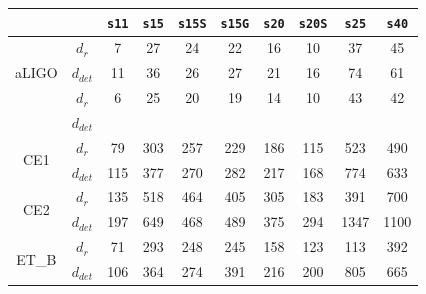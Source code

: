 \begin{table}
  \centering
  \begin{tabular}{c|c|cccccccc}







    
    
\multicolumn{2}{c|}{}  & \texttt{s11} & \texttt{s15} & \texttt{s15S} & \texttt{s15G} & \texttt{s20} & \texttt{s20S} & \texttt{s25}  & \texttt{s40}\\   

\hline
\multirow{3}{*}{aLIGO} & $d_{r}$ & 7   & 27  & 24  & 22  & 16  & 10  & 37  & 45 \\
\cline{2-10}
                       & $d_{det}$ & 11 & 36 & 26 & 27 & 21 & 16 & 74 & 61\\

\hline
\hline
\multirow{3}{*}{ADV}   & $d_{r}$ & 6   & 25  & 20  & 19  & 14  & 10  & 43  & 42 \\
\cline{2-10}
                       & $d_{det}$ &  &  &  &  &  &  &  & \\

\hline
\hline
\multirow{2}{*}{CE1}   & $d_{r}$   & 79  & 303 & 257 & 229 & 186 & 115 & 523 & 490 \\
\cline{2-10}
                       & $d_{det}$ & 115 & 377 & 270 & 282 & 217 & 168 & 774  & 633\\

\hline
\multirow{2}{*}{CE2}   & $d_{r}$  & 135 & 518 & 464 & 405 & 305 & 183 & 391 & 700 \\
\cline{2-10}
                       & $d_{det}$ & 197 & 649 & 468 & 489 & 375 & 294 & 1347  & 1100\\

\hline
\multirow{2}{*}{ET\_B} & $d_{r}$ & 71  & 293 & 248 & 245 & 158 & 123 & 113 & 392 \\
\cline{2-10}
                       & $d_{det}$ & 106 & 364 & 274 & 391 & 216 & 200 & 805 & 665\\


\end{tabular}
\end{table}
